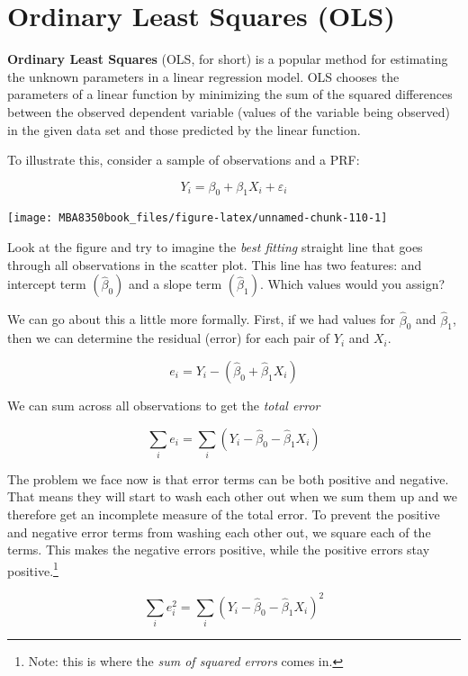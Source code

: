 \documentclass[
]{book}
\begin{document}
\hypertarget{ordinary-least-squares-ols}{%
\section{Ordinary Least Squares (OLS)}\label{ordinary-least-squares-ols}}

\textbf{Ordinary Least Squares} (OLS, for short) is a popular method for estimating the unknown parameters in a linear regression model. OLS chooses the parameters of a linear function by minimizing the sum of the squared differences between the observed dependent variable (values of the variable being observed) in the given data set and those predicted by the linear function.

To illustrate this, consider a sample of observations and a PRF:

\[Y_i=\beta_0+\beta_1X_i+\varepsilon_i\]

\begin{center}\texttt{[image: MBA8350book\_files/figure-latex/unnamed-chunk-110-1]} \end{center}

Look at the figure and try to imagine the \emph{best fitting} straight line that goes through all observations in the scatter plot. This line has two features: and intercept term \((\hat{\beta}_0)\) and a slope term \((\hat{\beta}_1)\). Which values would you assign?

We can go about this a little more formally. First, if we had values for \(\hat{\beta}_0\) and \(\hat{\beta}_1\), then we can determine the residual (error) for each pair of \(Y_i\) and \(X_i\).

\[e_i = Y_i - (\hat{\beta}_0 + \hat{\beta}_1X_i)\]

We can sum across all observations to get the \emph{total error}

\[\sum_{i}e_i = \sum_{i}(Y_i - \hat{\beta}_0 - \hat{\beta}_1X_i)\]

The problem we face now is that error terms can be both positive and negative. That means they will start to wash each other out when we sum them up and we therefore get an incomplete measure of the total error. To prevent the positive and negative error terms from washing each other out, we square each of the terms. This makes the negative errors positive, while the positive errors stay positive.\footnote{Note: this is where the \emph{sum of squared errors} comes in.}

\[\sum_{i}e^2_i = \sum_{i}(Y_i - \hat{\beta}_0 - \hat{\beta}_1X_i)^2\]
\end{document}
